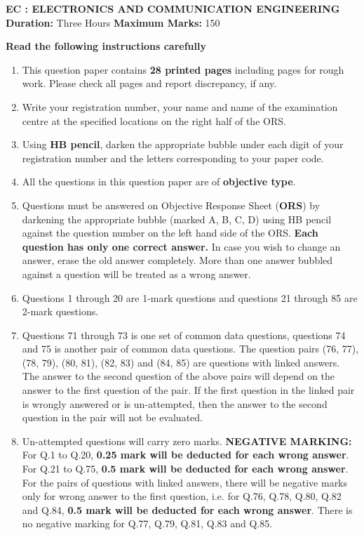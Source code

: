 \documentclass[12pt]{article}
\begin{document}
\begin{center}
    {\LARGE \textbf{EC : ELECTRONICS AND COMMUNICATION ENGINEERING}}\\[0.7em]
    \textbf{Duration:} Three Hours
    \hspace{2cm}
    \textbf{Maximum Marks:} 150
\end{center}


\textbf{Read the following instructions carefully}
\begin{enumerate}[leftmargin=2em,itemsep=0.5em]
    \item This question paper contains \textbf{28 printed pages} including pages for rough work. Please check all pages and report discrepancy, if any.
    \item Write your registration number, your name and name of the examination centre at the specified locations on the right half of the ORS.
    \item Using \textbf{HB pencil}, darken the appropriate bubble under each digit of your registration number and the letters corresponding to your paper code.
    \item All the questions in this question paper are of \textbf{objective type}.
    \item Questions must be answered on Objective Response Sheet (\textbf{ORS}) by darkening the appropriate bubble (marked A, B, C, D) using HB pencil against the question number on the left hand side of the ORS. \textbf{Each question has only one correct answer.} In case you wish to change an answer, erase the old answer completely. More than one answer bubbled against a question will be treated as a wrong answer.
    \item Questions 1 through 20 are 1-mark questions and questions 21 through 85 are 2-mark questions.
    \item Questions 71 through 73 is one set of common data questions, questions 74 and 75 is another pair of common data questions. The question pairs (76, 77), (78, 79), (80, 81), (82, 83) and (84, 85) are questions with linked answers. The answer to the second question of the above pairs will depend on the answer to the first question of the pair. If the first question in the linked pair is wrongly answered or is un-attempted, then the answer to the second question in the pair will not be evaluated.
    \item Un-attempted questions will carry zero marks.
     \large \textbf {NEGATIVE MARKING:} For Q.1 to Q.20, \textbf{0.25 mark will be deducted for each wrong answer}. For Q.21 to Q.75, \textbf{0.5 mark will be deducted for each wrong answer}. For the pairs of questions with linked answers, there will be negative marks only for wrong answer to the first question, i.e. for Q.76, Q.78, Q.80, Q.82 and Q.84, \textbf{0.5 mark will be deducted for each wrong answer}. There is no negative marking for Q.77, Q.79, Q.81, Q.83 and Q.85.

\end{enumerate}
\end{document}
